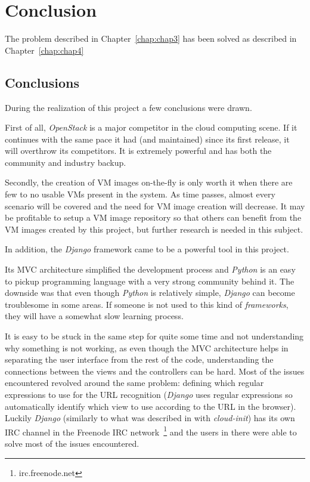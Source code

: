 \chapter{Conclusion} \label{chap:concl}

The problem described in Chapter~\ref{chap:chap3} has been solved as described in Chapter~\ref{chap:chap4}

\section{Conclusions}\label{sec:conclusions}

During the realization of this project a few conclusions were drawn.

First of all, \textit{OpenStack} is a major competitor in the cloud computing scene. If it continues with the same pace it had (and maintained) since its first release, it will overthrow its competitors. It is extremely powerful and has both the community and industry backup.

Secondly, the creation of VM images on-the-fly is only worth it when there are few to no usable VMs present in the system. As time passes, almost every scenario will be covered and the need for VM image creation will decrease. It may be profitable to setup a VM image repository so that others can benefit from the VM images created by this project, but further research is needed in this subject.

In addition, the \textit{Django} framework came to be a powerful tool in this project.

Its MVC architecture simplified the development process and \textit{Python} is an easy to pickup programming language with a very strong community behind it. The downside was that even though \textit{Python} is relatively simple, \textit{Django} can become troublesome in some areas. If someone is not used to this kind of \textit{frameworks}, they will have a somewhat slow learning process. 

It is easy to be stuck in the same step for quite some time and not understanding why something is not working, as even though the MVC architecture helps in separating the user interface from the rest of the code, understanding the connections between the views and the controllers can be hard. Most of the issues encountered revolved around the same problem: defining which regular expressions to use for the URL recognition (\textit{Django} uses regular expressions so automatically identify which view to use according to the URL in the browser). Luckily \textit{Django} (similarly to what was described in  with \textit{cloud-init}) has its own IRC channel in the Freenode IRC network~\footnote{irc.freenode.net} and the users in there were able to solve most of the issues encountered.

